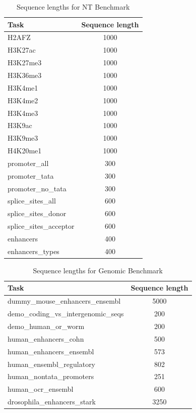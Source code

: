 \documentclass[   ]{article}
\begin{document}
\begin{table}[htbp]
	\centering
	\caption{Sequence lengths for NT Benchmark}
	\begin{tabular}{lc}
		\toprule
		Task & Sequence length \\
		\midrule
		H2AFZ & 1000 \\
		H3K27ac & 1000 \\
		H3K27me3 & 1000 \\
		H3K36me3 & 1000 \\
		H3K4me1 & 1000 \\
		H3K4me2 & 1000 \\
		H3K4me3 & 1000 \\
		H3K9ac & 1000 \\
		H3K9me3 & 1000 \\
		H4K20me1 & 1000 \\
		promoter\_all & 300 \\
		promoter\_tata & 300 \\
		promoter\_no\_tata & 300 \\
		splice\_sites\_all & 600 \\
		splice\_sites\_donor & 600 \\
		splice\_sites\_acceptor & 600 \\
		enhancers & 400 \\
		enhancers\_types & 400 \\
		\bottomrule
	\end{tabular}
\end{table}

\begin{table}[htbp]
	\centering
	\caption{Sequence lengths for Genomic Benchmark}
	\begin{tabular}{lc}
		\toprule
		Task & Sequence length \\
		\midrule
		dummy\_mouse\_enhancers\_ensembl & 5000 \\
		demo\_coding\_vs\_intergenomic\_seqs & 200 \\
		demo\_human\_or\_worm & 200 \\
		human\_enhancers\_cohn & 500 \\
		human\_enhancers\_ensembl & 573 \\
		human\_ensembl\_regulatory & 802 \\
		human\_nontata\_promoters & 251 \\
		human\_ocr\_ensembl & 600 \\
		drosophila\_enhancers\_stark & 3250 \\
		\bottomrule
	\end{tabular}
\end{table}
\end{document}
